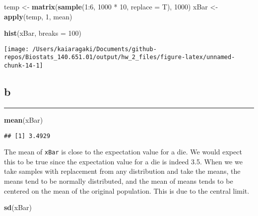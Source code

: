 \documentclass[]{tufte-handout}
\newenvironment{Shaded}{}{}
\newcommand{\DataTypeTok}[1]{\textcolor[rgb]{0.56,0.13,0.00}{#1}}
\newcommand{\DecValTok}[1]{\textcolor[rgb]{0.25,0.63,0.44}{#1}}
\newcommand{\KeywordTok}[1]{\textcolor[rgb]{0.00,0.44,0.13}{\textbf{#1}}}
\newcommand{\NormalTok}[1]{#1}
\newcommand{\OperatorTok}[1]{\textcolor[rgb]{0.40,0.40,0.40}{#1}}
\newcommand{\StringTok}[1]{\textcolor[rgb]{0.25,0.44,0.63}{#1}}
\begin{document}
\begin{Shaded}
\begin{Highlighting}[]
\NormalTok{temp <-}\StringTok{ }\KeywordTok{matrix}\NormalTok{(}\KeywordTok{sample}\NormalTok{(}\DecValTok{1}\OperatorTok{:}\DecValTok{6}\NormalTok{, }\DecValTok{1000} \OperatorTok{*}\StringTok{ }\DecValTok{10}\NormalTok{, }\DataTypeTok{replace =}\NormalTok{ T), }\DecValTok{1000}\NormalTok{)}
\NormalTok{xBar <-}\StringTok{ }\KeywordTok{apply}\NormalTok{(temp, }\DecValTok{1}\NormalTok{, mean)}
\end{Highlighting}
\end{Shaded}

\begin{Shaded}
\begin{Highlighting}[]
\KeywordTok{hist}\NormalTok{(xBar, }\DataTypeTok{breaks =} \DecValTok{100}\NormalTok{)}
\end{Highlighting}
\end{Shaded}

\texttt{[image: /Users/kaiaragaki/Documents/github-repos/Biostats\_140.651.01/output/hw\_2\_files/figure-latex/unnamed-chunk-14-1]}

\hypertarget{b-11}{%
\subsection{b}\label{b-11}}

\begin{center}\rule{0.5\linewidth}{0.5pt}\end{center}

\begin{Shaded}
\begin{Highlighting}[]
\KeywordTok{mean}\NormalTok{(xBar)}
\end{Highlighting}
\end{Shaded}

\begin{verbatim}
## [1] 3.4929
\end{verbatim}

The mean of \texttt{xBar} is close to the expectation value for a die.
We would expect this to be true since the expectation value for a die is
indeed 3.5. When we we take samples with replacement from any
distribution and take the means, the means tend to be normally
distributed, and the mean of means tends to be centered on the mean of
the original population. This is due to the central limit.

\begin{Shaded}
\begin{Highlighting}[]
\KeywordTok{sd}\NormalTok{(xBar)}
\end{Highlighting}
\end{Shaded}
\end{document}
